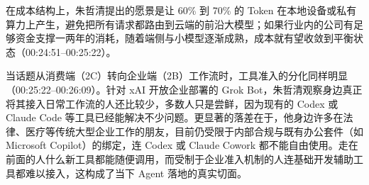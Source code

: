 \documentclass[UTF8,a4paper,11pt,fontset=fandol]{ctexart}
\begin{document}
在成本结构上，朱哲清提出的愿景是让 60\% 到 70\% 的 Token 在本地设备或私有算力上产生，避免把所有请求都路由到云端的前沿大模型；如果行业内的公司有足够资金支撑一两年的消耗，随着端侧与小模型逐渐成熟，成本就有望收敛到平衡状态（00:24:51–00:25:22）。

当话题从消费端（2C）转向企业端（2B）工作流时，工具准入的分化同样明显（00:25:22–00:26:09）。针对 xAI 开放企业部署的 Grok Bot，朱哲清观察身边真正将其接入日常工作流的人还比较少，多数人只是尝鲜，因为现有的 Codex 或 Claude Code 等工具已经能解决不少问题。更显著的落差在于，他身边许多在法律、医疗等传统大型企业工作的朋友，目前仍受限于内部合规与既有办公套件（如 Microsoft Copilot）的绑定，连 Codex 或 Claude Cowork 都不能自由使用。走在前面的人什么新工具都能随便调用，而受制于企业准入机制的人连基础开发辅助工具都难以接入，这构成了当下 Agent 落地的真实切面。
\end{document}
